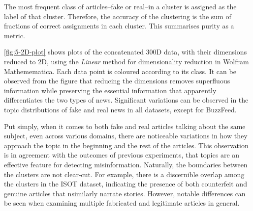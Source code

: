 The most frequent class of articles--fake or real--in a cluster is assigned as the label of that cluster. Therefore, the accuracy of the clustering is the sum of fractions of correct assignments in each cluster. This summarises purity as a metric.

\autoref{fig:5-2D-plot} shows plots of the concatenated 300D data, with their dimensions reduced to 2D, using the \emph{Linear} method for dimensionality reduction in Wolfram Mathemematica. Each data point is coloured according to its class. It can be observed from the figure that reducing the dimensions removes superfluous information while preserving the essential information that apparently differentiates the two types of news. Significant variations can be observed in the topic distributions of fake and real news in all datasets, except for BuzzFeed.

Put simply, when it comes to both fake and real articles talking about the same subject, even across various domains, there are noticeable variations in how they approach the topic in the beginning and the rest of the articles. This observation is in agreement with the outcomes of previous experiments, that topics are an effective feature for detecting misinformation. Naturally, the boundaries between the clusters are not clear-cut. For example, there is a discernible overlap among the clusters in the ISOT dataset, indicating the presence of both counterfeit and genuine articles that nsimilarly narrate stories. However, notable differences can be seen when examining multiple fabricated and legitimate articles in general.

